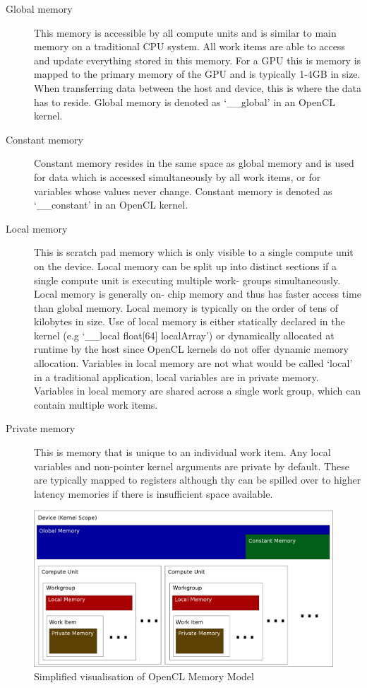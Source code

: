 \begin{description}

\item[Global memory] This memory is accessible by all compute units and is
similar to main memory on a traditional CPU system. All work items are able to
access and update everything stored in this memory. For a GPU this is memory is
mapped to the primary memory of the GPU and is typically 1-4GB in size. When
transferring data between the host and device, this is where the data has to
reside. Global memory is denoted as `\_\_global' in an OpenCL kernel.

\item[Constant memory] Constant memory resides in the same space as global
memory and is used for data which is accessed simultaneously by all work items,
or for variables whose values never change. Constant memory is denoted as
`\_\_constant' in an OpenCL kernel.

\item[Local memory] This is scratch pad memory which is only visible to a single
compute unit on the device. Local memory can be split up into distinct sections
if a single compute unit is executing multiple work- groups simultaneously.
Local memory is generally on- chip memory and thus has faster access time than
global memory. Local memory is typically on the order of tens of kilobytes in
size. Use of local memory is either statically declared in the kernel (e.g
`\_\_local float[64] localArray') or dynamically allocated at runtime by the
host since OpenCL kernels do not offer dynamic memory allocation. Variables in
local memory are not what would be called `local' in a traditional application,
local variables are in private memory. Variables in local memory are shared
across a single work group, which can contain multiple work items.

\item[Private memory] This is memory that is unique to an individual work item.
Any local variables and non-pointer kernel arguments are private by default.
These are typically mapped to registers although thy can be spilled over to
higher latency memories if there is insufficient space available.

\end{description}

\begin{figure}
\includegraphics[width=\linewidth]{images/openCLMemoryModel.png}
\caption{Simplified visualisation of OpenCL Memory Model}
\label{fig:openCLMemoryModel}
\end{figure}

